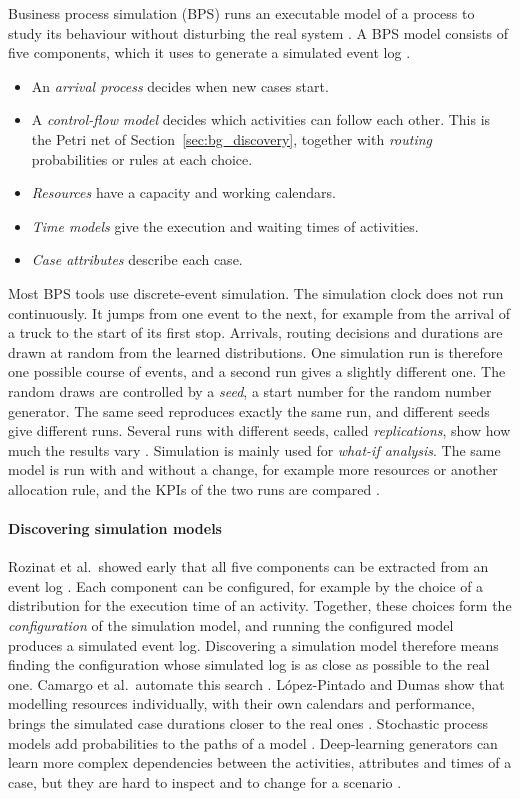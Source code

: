Business process simulation (BPS) runs an executable model of a process to
study its behaviour without disturbing the real system \cite{Aalst2015}. A
BPS model consists of five components, which it uses to generate a simulated
event log \cite{Aalst2015,PMRozinat2009}.
\begin{itemize}[itemsep=2pt,topsep=4pt]
\item An \emph{arrival process} decides when new cases start.
\item A \emph{control-flow model} decides which activities can follow each other.
This is the Petri net of Section~\ref{sec:bg_discovery}, together with
\emph{routing} probabilities or rules at each choice.
\item \emph{Resources} have a capacity and working calendars.
\item \emph{Time models} give the execution and waiting times of activities.
\item \emph{Case attributes} describe each case.
\end{itemize}
Most BPS tools use discrete-event simulation. The simulation clock does not run
continuously. It jumps from one event to the next, for example from the arrival
of a truck to the start of its first stop. Arrivals, routing decisions and
durations are drawn at random from the learned distributions. One simulation run
is therefore one possible course of events, and a second run gives a slightly
different one. The random draws are controlled by a \emph{seed}, a start number
for the random number generator. The same seed reproduces exactly the same run,
and different seeds give different runs. Several runs with different seeds,
called \emph{replications}, show how much the results vary
\cite{Law2015Simulation}. Simulation is mainly used for \emph{what-if analysis}.
The same model is run with and without a change, for example more resources or
another allocation rule, and the KPIs of the two runs are compared
\cite{Aalst2015}.

\paragraph{Discovering simulation models}
Rozinat et al.\ showed early that all five components can be extracted from an
event log \cite{PMRozinat2009}. Each component can be configured, for example by
the choice of a distribution for the execution time of an activity. Together,
these choices form the \emph{configuration} of the simulation model, and running
the configured model produces a simulated event log. Discovering a simulation
model therefore means finding the configuration whose simulated log is as close
as possible to the real one. Camargo et al.\ automate this search
\cite{Camargo2020}. L\'opez-Pintado and Dumas show that modelling resources
individually, with their own calendars and performance, brings the simulated
case durations closer to the real ones \cite{BPSdifferentiatedResources2022}.
Stochastic process models add probabilities to the paths of a model
\cite{stochastikPetriNets2013Solti}. Deep-learning generators can learn more
complex dependencies between the activities, attributes and times of a case,
but they are hard to inspect and to change for a scenario \cite{Camargo2021}.

